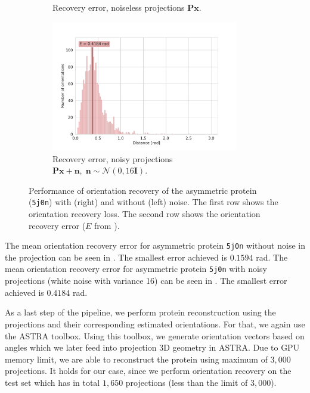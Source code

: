 \begin{figure}[ht!]
\begin{subfigure}[b]{0.45\textwidth}
        \caption{Recovery error, noiseless projections $\mathbf{Px}$.}
        \label{fig:angle-alignment-5j0n-noise0}
    \end{subfigure}
    \hfill
    \begin{subfigure}[b]{0.5\textwidth}
    \centering
        \includegraphics[height=5.7cm]{figures/5j0n_noise16_angle_alignment_after}
        \caption{Recovery error, noisy projections $\mathbf{Px+n}, \; \mathbf{n} \sim \mathcal{N}(0, 16\mathbf{I})$.}
        \label{fig:angle-alignment-5j0n-noise16}
    \end{subfigure}
    \caption{%
        Performance of orientation recovery of the asymmetric protein (\texttt{5j0n}) with (right) and without (left) noise.
        The first row shows the orientation recovery loss.
        The second row shows the orientation recovery error ($E$ from ).
    }\label{fig:5j0n-orientation-recovery-loss-est}
\end{figure}

The mean orientation recovery error for asymmetric protein \texttt{5j0n} without noise in the projection can be seen in .
The smallest error achieved is $0.1594$ rad.
The mean orientation recovery error for asymmetric protein \texttt{5j0n} with noisy projections (white noise with variance 16) can be seen in . 
The smallest error achieved is $0.4184$ rad.

As a last step of the pipeline, we perform protein reconstruction using the projections and their corresponding estimated orientations.
For that, we again use the ASTRA toolbox.
Using this toolbox, we generate orientation vectors based on angles which we later feed into projection 3D geometry in ASTRA.
Due to GPU memory limit, we are able to reconstruct the protein using maximum of $3,000$ projections.
It holds for our case, since we perform orientation recovery on the test set which has in total $1,650$ projections (less than the limit of $3,000$).

